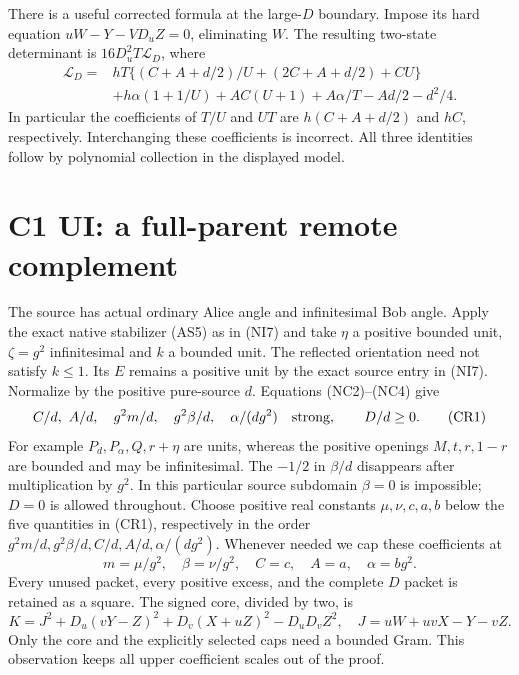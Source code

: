 There is a useful corrected formula at the large-$D$ boundary.
Impose its hard equation $uW-Y-VD_uZ=0$, eliminating $W$.
The resulting two-state determinant is $16D_u^2T\mathcal L_D$, where
\begin{align*}
\mathcal L_D={}&hT\{(C+A+d/2)/U+(2C+A+d/2)+CU\}\\
 &+h\alpha(1+1/U)+AC(U+1)+A\alpha/T-Ad/2-d^2/4.
                                                               \tag{CL6}
\end{align*}
In particular the coefficients of $T/U$ and $UT$ are
$h(C+A+d/2)$ and $hC$, respectively. Interchanging these coefficients
is incorrect. All three identities follow by polynomial collection in the displayed model.


\section{\texorpdfstring{C1 UI: a full-parent remote complement}{C1 UI: a full-parent remote complement}}
\label{component:p013c226a79b3}

\label{p013c226a79b3:sec:c1-ui-remote}
The source has actual ordinary Alice angle and infinitesimal Bob
angle. Apply the exact native stabilizer (AS5) as in (NI7) and take
$\eta$ a positive bounded unit, $\zeta=g^2$ infinitesimal and $k$ a
bounded unit. The reflected orientation need not satisfy $k\le1$.
Its $E$ remains a positive unit by the exact source entry in (NI7).
Normalize by the positive pure-source $d$.
Equations (NC2)--(NC4) give
\[
 C/d,\ A/d,\quad g^2m/d,\quad g^2\beta/d,\quad
 \alpha/(dg^2)\quad\hbox{strong},\qquad D/d\ge0.       \tag{CR1}
\]
For example $P_d,P_\alpha,Q,r+\eta$ are units, whereas the
positive openings $M,t,r,1-r$ are bounded and may be infinitesimal.
The $-1/2$ in $\beta/d$ disappears after multiplication by $g^2$.
In this particular source subdomain $\beta=0$ is impossible; $D=0$
is allowed throughout. Choose positive real constants
$\mu,\nu,c,a,b$ below the five quantities in (CR1), respectively
in the order $g^2m/d,g^2\beta/d,C/d,A/d,\alpha/(dg^2)$.
Whenever needed we cap these coefficients at
\[
 m=\mu/g^2,\quad\beta=\nu/g^2,\quad C=c,\quad A=a,
 \quad\alpha=bg^2.                                  \tag{CR2}
\]
Every unused packet, every positive excess, and the complete $D$
packet is retained as a square. The signed core, divided by two, is
\[
 K=J^2+D_u(vY-Z)^2+D_v(X+uZ)^2-D_uD_vZ^2,
 \quad J=uW+uvX-Y-vZ.                              \tag{CR3}
\]
Only the core and the explicitly selected caps need a bounded Gram.
This observation keeps all upper coefficient scales out of the proof.

